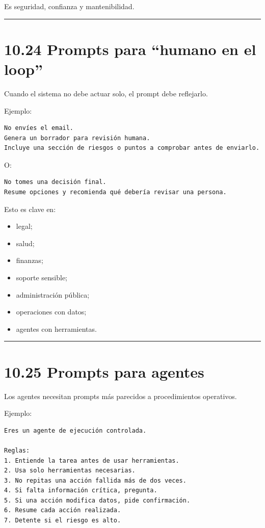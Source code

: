 Es seguridad, confianza y mantenibilidad.

\begin{center}\rule{0.5\linewidth}{0.5pt}\end{center}

\section{10.24 Prompts para ``humano en el
loop''}\label{prompts-para-humano-en-el-loop}

Cuando el sistema no debe actuar solo, el prompt debe reflejarlo.

Ejemplo:

\begin{lstlisting}
No envíes el email.
Genera un borrador para revisión humana.
Incluye una sección de riesgos o puntos a comprobar antes de enviarlo.
\end{lstlisting}

O:

\begin{lstlisting}
No tomes una decisión final.
Resume opciones y recomienda qué debería revisar una persona.
\end{lstlisting}

Esto es clave en:

\begin{itemize}
\tightlist
\item
  legal;
\item
  salud;
\item
  finanzas;
\item
  soporte sensible;
\item
  administración pública;
\item
  operaciones con datos;
\item
  agentes con herramientas.
\end{itemize}

\begin{center}\rule{0.5\linewidth}{0.5pt}\end{center}

\section{10.25 Prompts para agentes}\label{prompts-para-agentes-1}

Los agentes necesitan prompts más parecidos a procedimientos operativos.

Ejemplo:

\begin{lstlisting}
Eres un agente de ejecución controlada.

Reglas:
1. Entiende la tarea antes de usar herramientas.
2. Usa solo herramientas necesarias.
3. No repitas una acción fallida más de dos veces.
4. Si falta información crítica, pregunta.
5. Si una acción modifica datos, pide confirmación.
6. Resume cada acción realizada.
7. Detente si el riesgo es alto.
\end{lstlisting}

